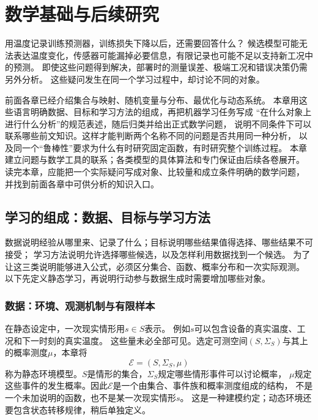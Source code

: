 \chapter{数学基础与后续研究}
\label{chap:mathematics-and-future-research}

用温度记录训练预测器，训练损失下降以后，还需要回答什么？
候选模型可能无法表达温度变化，传感器可能漏掉必要信息，有限记录也可能不足以支持新工况中的预测。
即使这些问题得到解决，部署时的测量误差、极端工况和错误决策仍需另外分析。
这些疑问发生在同一个学习过程中，却讨论不同的对象。

前面各章已经介绍集合与映射、随机变量与分布、最优化与动态系统。
本章用这些语言明确数据、目标和学习方法的组成，再把机器学习任务写成
“在什么对象上进行什么分析”的规范表述，随后归类并给出正式数学问题，
说明不同条件下可以联系哪些前文知识。这样才能判断两个名称不同的问题是否共用同一种分析，
以及同一个“鲁棒性”要求为什么有时研究固定函数，有时研究整个训练过程。
本章建立问题与数学工具的联系；各类模型的具体算法和专门保证由后续各卷展开。
读完本章，应能把一个实际疑问写成对象、比较量和成立条件明确的数学问题，
并找到前面各章中可供分析的知识入口。

\section{学习的组成：数据、目标与学习方法}
\label{sec:future-unified-learning-framework}
\label{sec:future-learning-data-and-use}

数据说明经验从哪里来、记录了什么；目标说明哪些结果值得选择、哪些结果不可接受；
学习方法说明允许选择哪些候选，以及怎样利用数据找到一个候选。
为了让这三类说明能够进入公式，必须区分集合、函数、概率分布和一次实际观测。
以下先定义静态学习，再说明行动参与数据生成时需要增加哪些对象。

\subsection{数据：环境、观测机制与有限样本}
\label{sec:future-learning-data-objects}

在静态设定中，一次现实情形用$s\in S$表示。
例如$s$可以包含设备的真实温度、工况和下一时刻的真实温度。
这些量未必全部可见。选定可测空间$(S,\Sigma_S)$与其上的概率测度$\mu$，本章将
\begin{equation}
  \mathcal E=(S,\Sigma_S,\mu)
  \label{eq:future-static-environment}
\end{equation}
称为静态环境模型。$S$是情形的集合，$\Sigma_S$规定哪些情形事件可以讨论概率，
$\mu$规定这些事件的发生概率。因此$\mathcal E$是一个由集合、事件族和概率测度组成的结构，
不是一个未加说明的函数，也不是某一次现实情形$s$。
这是一种建模约定；动态环境还要包含状态转移规律，稍后单独定义。

